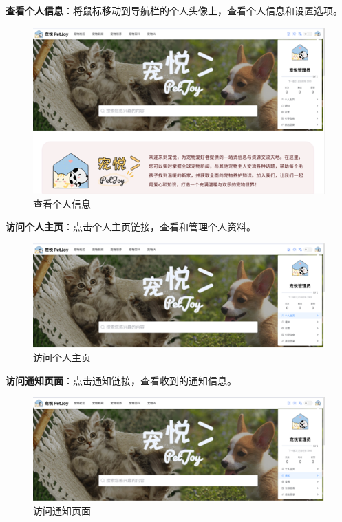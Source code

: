 \begin{itemize}
	\textbf{查看个人信息}：将鼠标移动到导航栏的个人头像上，查看个人信息和设置选项。

	\begin{figure}[H]
		\centering
		\includegraphics[scale=0.8]{figures/TopNavigationBar6.png} 
		\caption{查看个人信息}
	\end{figure}

	\textbf{访问个人主页}：点击个人主页链接，查看和管理个人资料。

	\begin{figure}[H]
		\centering
		\includegraphics[scale=0.8]{figures/TopNavigationBar7.png} 
		\caption{访问个人主页}
	\end{figure}

	\textbf{访问通知页面}：点击通知链接，查看收到的通知信息。

	\begin{figure}[H]
		\centering
		\includegraphics[scale=0.8]{figures/TopNavigationBar8.png} 
		\caption{访问通知页面}
	\end{figure}


\end{itemize}
